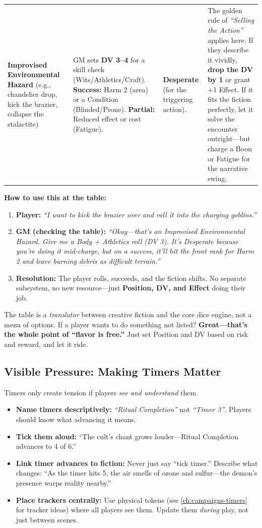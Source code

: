 \begin{center}
\begin{longtable}{p{2.2cm}p{2.8cm}p{2.0cm}p{4.6cm}}
\textbf{Improvised Environmental Hazard} (e.g., chandelier drop, kick the brazier, collapse the stalactite) & GM sets \textbf{DV 3--4} for a skill check (Wits/Athletics/Craft). \textbf{Success:} Harm 2 (area) or a Condition (Blinded/Prone). \textbf{Partial:} Reduced effect or cost (Fatigue). & \textbf{Desperate} (for the triggering action). & The golden rule of \textit{``Selling the Action''} applies here. If they describe it vividly, \textbf{drop the DV by 1} or grant +1 Effect. If it fits the fiction perfectly, let it solve the encounter outright---but charge a Boon or Fatigue for the narrative swing. \\
\end{longtable}
\end{center}

\noindent\textbf{How to use this at the table:}

\begin{enumerate}
  \item \textbf{Player:} \textit{``I want to kick the brazier over and roll it into the charging goblins.''}
  \item \textbf{GM (checking the table):} \textit{``Okay---that's an Improvised Environmental Hazard. Give me a Body + Athletics roll (DV 3). It's Desperate because you're doing it mid-charge, but on a success, it'll hit the front rank for Harm 2 and leave burning debris as difficult terrain.''}
  \item \textbf{Resolution:} The player rolls, succeeds, and the fiction shifts. No separate subsystem, no new resource---just \textbf{Position, DV, and Effect} doing their job.
\end{enumerate}

The table is a \textit{translator} between creative fiction and the core dice engine, not a menu of options. If a player wants to do something not listed? \textbf{Great---that's the whole point of ``flavor is free.''} Just set Position and DV based on risk and reward, and let it ride.

\subsection{Visible Pressure: Making Timers Matter}
Timers only create tension if players \textit{see and understand} them.
\begin{itemize}
  \item \textbf{Name timers descriptively:} \emph{``Ritual Completion''} not \emph{``Timer 3''}. Players should know what advancing it means.
  \item \textbf{Tick them aloud:} ``The cult's chant grows louder---Ritual Completion advances to 4 of 6.''
  \item \textbf{Link timer advances to fiction:} Never just say ``tick timer.'' Describe what changes: ``As the timer hits 5, the air smells of ozone and sulfur---the demon's presence warps reality nearby.''
  \item \textbf{Place trackers centrally:} Use physical tokens (see \ref{ch:campaigns-timers} for tracker ideas) where all players see them. Update them \textit{during} play, not just between scenes.
\end{itemize}

